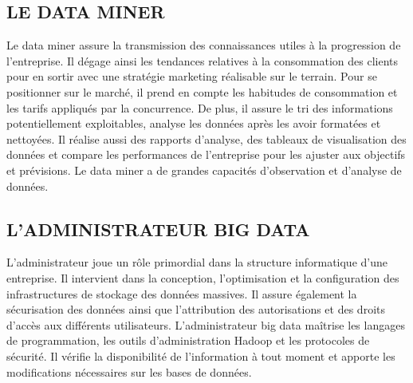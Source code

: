 \subsection{LE DATA MINER}
Le data miner assure la transmission des connaissances utiles à la progression de l’entreprise. Il dégage ainsi les tendances relatives à la consommation des clients pour en sortir avec une stratégie marketing réalisable sur le terrain. Pour se positionner sur le marché, il prend en compte les habitudes de consommation et les tarifs appliqués par la concurrence. De plus, il assure le tri des informations potentiellement exploitables, analyse les données après les avoir formatées et nettoyées. Il réalise aussi des rapports d’analyse, des tableaux de visualisation des données et compare les performances de l’entreprise pour les ajuster aux objectifs et prévisions. Le data miner a de grandes capacités d’observation et d’analyse de données.

\subsection{L'ADMINISTRATEUR BIG DATA}
L'administrateur joue un rôle primordial dans la structure informatique d'une entreprise. Il intervient dans la conception, l'optimisation et la configuration des infrastructures de stockage des données massives. Il assure également la sécurisation des données ainsi que l'attribution des autorisations et des droits d'accès aux différents utilisateurs. L'administrateur big data maîtrise les langages de programmation, les outils d'administration Hadoop et les protocoles de sécurité. Il vérifie la disponibilité de l'information à tout moment et apporte les modifications nécessaires sur les bases de données.